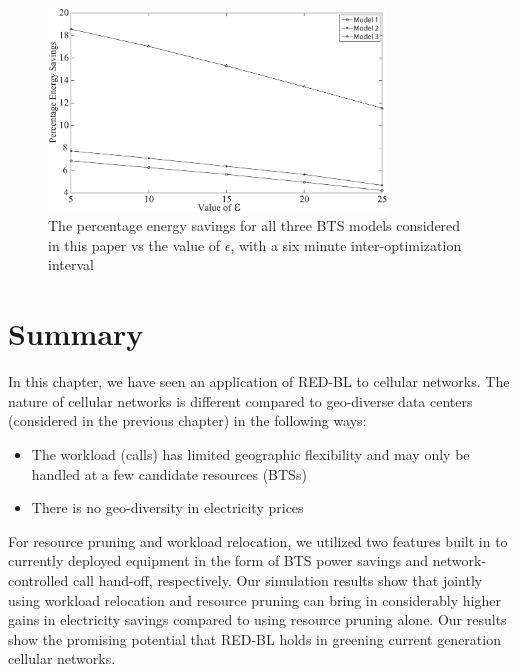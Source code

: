 \begin{figure}
\centering
\includegraphics[width=0.8\textwidth]{pics/ilyas7.eps}
\caption{The percentage energy savings for all three BTS models considered in this paper vs the value of $\epsilon$, with a six minute inter-optimization interval}
\label{fig:case2:results6}
\end{figure}

\section{Summary}
\label{sec:discuss:case2} In this chapter, we have seen an application of RED-BL to cellular networks. The nature of cellular networks is different compared to geo-diverse data centers (considered in the previous chapter) in the following ways:

\begin{itemize}
\item The workload (calls) has limited geographic flexibility and may only be handled at a few candidate resources (BTSs)
\item There is no geo-diversity in electricity prices
\end{itemize}

For resource pruning and workload relocation, we utilized two features built in to currently deployed equipment in the form of BTS power savings and network-controlled call hand-off, respectively. Our simulation results show that jointly using workload relocation and resource pruning can bring in considerably higher gains in electricity savings compared to using resource pruning alone. Our results show the promising potential that RED-BL holds in greening current generation cellular networks.